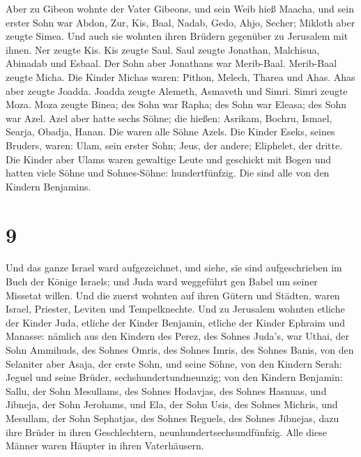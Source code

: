  Aber zu Gibeon wohnte der Vater Gibeons, und sein Weib
hieß Maacha,  und sein erster Sohn war Abdon, Zur, Kis,
Baal, Nadab,  Gedo, Ahjo, Secher;  Mikloth
aber zeugte Simea. Und auch sie wohnten ihren Brüdern gegenüber zu
Jerusalem mit ihnen.  Ner zeugte Kis. Kis zeugte Saul. Saul
zeugte Jonathan, Malchisua, Abinadab und Esbaal.  Der Sohn
aber Jonathans war Merib-Baal. Merib-Baal zeugte Micha. 
Die Kinder Michas waren: Pithon, Melech, Tharea und Ahas. 
Ahas aber zeugte Joadda. Joadda zeugte Alemeth, Asmaveth und Simri.
Simri zeugte Moza.  Moza zeugte Binea; des Sohn war Rapha;
des Sohn war Eleasa; des Sohn war Azel.  Azel aber hatte
sechs Söhne; die hießen: Asrikam, Bochru, Ismael, Searja, Obadja, Hanan.
Die waren alle Söhne Azels.  Die Kinder Eseks, seines
Bruders, waren: Ulam, sein erster Sohn; Jeus, der andere; Eliphelet, der
dritte.  Die Kinder aber Ulams waren gewaltige Leute und
geschickt mit Bogen und hatten viele Söhne und Sohnes-Söhne:
hundertfünfzig. Die sind alle von den Kindern Benjamins.

\hypertarget{section-8}{%
\section{9}\label{section-8}}

 Und das ganze Israel ward aufgezeichnet, und siehe, sie
sind aufgeschrieben im Buch der Könige Israels; und Juda ward weggeführt
gen Babel um seiner Missetat willen.  Und die zuerst wohnten
auf ihren Gütern und Städten, waren Israel, Priester, Leviten und
Tempelknechte.  Und zu Jerusalem wohnten etliche der Kinder
Juda, etliche der Kinder Benjamin, etliche der Kinder Ephraim und
Manasse:  nämlich aus den Kindern des Perez, des Sohnes
Juda's, war Uthai, der Sohn Ammihuds, des Sohnes Omris, des Sohnes
Imris, des Sohnes Banis,  von den Selaniter aber Asaja, der
erste Sohn, und seine Söhne,  von den Kindern Serah: Jeguel
und seine Brüder, sechshundertundneunzig;  von den Kindern
Benjamin: Sallu, der Sohn Mesullams, des Sohnes Hodavjas, des Sohnes
Hasnuas,  und Jibneja, der Sohn Jerohams, und Ela, der Sohn
Usis, des Sohnes Michris, und Mesullam, der Sohn Sephatjas, des Sohnes
Reguels, des Sohnes Jibnejas,  dazu ihre Brüder in ihren
Geschlechtern, neunhundertsechsundfünfzig. Alle diese Männer waren
Häupter in ihren Vaterhäusern.

